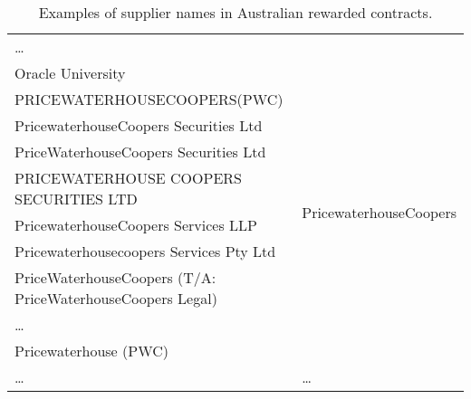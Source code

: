 \documentclass{llncs}
\begin{document}
\begin{table}[!htb]
\begin{center}
\begin{tabular}{|l|l|}
  \ldots  & \\
  Oracle University  & \\ \hline
  PRICEWATERHOUSECOOPERS(PWC)  & \multirow{8}{*}{PricewaterhouseCoopers} \\
  PricewaterhouseCoopers Securities Ltd & \\
  PriceWaterhouseCoopers Securities Ltd & \\
  PRICEWATERHOUSE COOPERS SECURITIES LTD & \\
  PricewaterhouseCoopers Services LLP & \\
  Pricewaterhousecoopers Services Pty Ltd & \\
  PriceWaterhouseCoopers (T/A: PriceWaterhouseCoopers Legal) & \\
  \ldots  & \\
  Pricewaterhouse (PWC) & \\ \hline
  \ldots & \ldots \\
  \hline
  \end{tabular}
  \caption{Examples of supplier names in Australian rewarded contracts.}
  \label{tabla:aus-suppliers}
  \end{center}
\end{table} 


\end{document}
